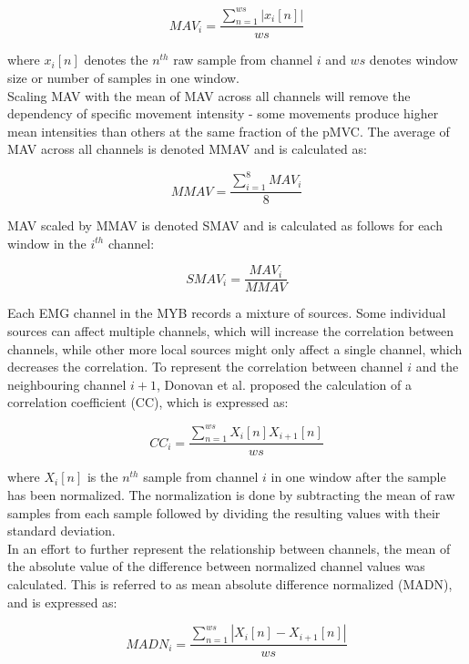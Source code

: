 \begin{equation} \label{eq:MAV}
MAV_i=\frac{\sum\limits_{n=1}^{ws}|x_i[n]|}{ws}
\end{equation}

where $x_i[n]$ denotes the $n^{th}$ raw sample from channel $i$ and $ws$ denotes window size or number of samples in one window. \\
Scaling MAV with the mean of MAV across all channels will remove the dependency of specific movement intensity - some movements produce higher mean intensities than others at the same fraction of the pMVC. The average of MAV across all channels is denoted MMAV and is calculated as: 

\begin{equation} \label{eq:MMAV}
MMAV=\frac{\sum\limits_{i=1}^{8}MAV_i}{8}
\end{equation}

MAV scaled by MMAV is denoted SMAV and is calculated as follows for each window in the $i^{th}$ channel:

\begin{equation} \label{eq:SMAV}
SMAV_i=\frac{MAV_i}{MMAV}
\end{equation}

Each EMG channel in the MYB records a mixture of sources. Some individual sources can affect multiple channels, which will increase the correlation between channels, while other more local sources might only affect a single channel, which decreases the correlation. To represent the correlation between channel $i$ and the neighbouring channel $i+1$, Donovan et al. proposed the calculation of a correlation coefficient (CC), which is expressed as: 

\begin{equation} \label{eq:CC}
CC_i=\frac{\sum\limits_{n=1}^{ws}X_i[n]X_{i+1}[n]}{ws}
\end{equation}

where $X_i[n]$ is the $n^{th}$ sample from channel $i$ in one window after the sample has been normalized. The normalization is done by subtracting the mean of raw samples from each sample followed by dividing the resulting values with their standard deviation.  \\
In an effort to further represent the relationship between channels, the mean of the absolute value of the difference between normalized channel values was calculated. This is referred to as mean absolute difference normalized (MADN), and is expressed as:

\begin{equation} \label{eq:MADN}
MADN_i=\frac{\sum\limits_{n=1}^{ws}|X_i[n]-X_{i+1}[n]|}{ws}
\end{equation}

